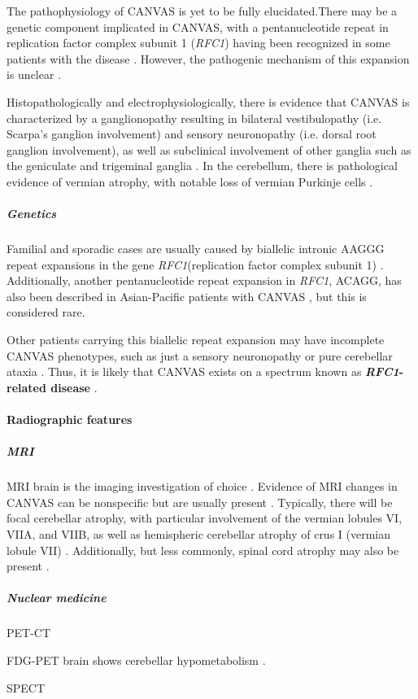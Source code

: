The pathophysiology of CANVAS is yet to be fully elucidated.There may be a genetic component implicated in CANVAS, with a pentanucleotide repeat in replication factor complex subunit 1 (\emph{RFC1}) having been recognized in some patients with the disease . However, the pathogenic mechanism of this expansion is unclear .

Histopathologically and electrophysiologically, there is evidence that CANVAS is characterized by a ganglionopathy resulting in bilateral vestibulopathy (i.e. Scarpa's ganglion involvement) and sensory neuronopathy (i.e. dorsal root ganglion involvement), as well as subclinical involvement of other ganglia such as the geniculate and trigeminal ganglia . In the cerebellum, there is pathological evidence of vermian atrophy, with notable loss of vermian Purkinje cells .

\subparagraph{Genetics}

Familial and sporadic cases are usually caused by biallelic intronic AAGGG repeat expansions in the gene \emph{RFC1}(replication factor complex subunit 1) . Additionally, another pentanucleotide repeat expansion in \emph{RFC1}, ACAGG, has also been described in Asian-Pacific patients with CANVAS , but this is considered rare.

Other patients carrying this biallelic repeat expansion may have incomplete CANVAS phenotypes, such as just a sensory neuronopathy or pure cerebellar ataxia . Thus, it is likely that CANVAS exists on a spectrum known as \textbf{\emph{RFC1}-related disease} .

\paragraph{Radiographic features}

\subparagraph{MRI}

MRI brain is the imaging investigation of choice . Evidence of MRI changes in CANVAS can be nonspecific but are usually present . Typically, there will be focal cerebellar atrophy, with particular involvement of the vermian lobules VI, VIIA, and VIIB, as well as hemispheric cerebellar atrophy of crus I (vermian lobule VII) . Additionally, but less commonly, spinal cord atrophy may also be present .

\subparagraph{Nuclear medicine}

PET-CT

FDG-PET brain shows cerebellar hypometabolism .

SPECT

